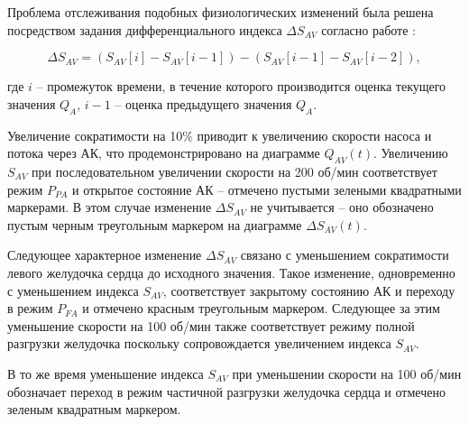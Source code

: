 Проблема отслеживания подобных физиологических изменений была решена посредством задания дифференциального индекса $\Delta S_{AV}$ согласно работе \cite{Karantonis_2006}:

\begin{equation}
	\Delta S_{AV} =  \left( S_{AV}[i] - S_{AV}[i-1] \right) - \left( S_{AV}[i-1] - S_{AV}[i-2] \right),
	\label{eq:delta_index}
\end{equation}

\noindent где $i$ -- промежуток времени, в течение которого производится оценка текущего значения $Q_A$, $i-1$ -- оценка предыдущего значения $Q_A$. 

Увеличение сократимости на 10\% приводит к увеличению скорости насоса и потока через АК, что продемонстрировано на диаграмме $Q_{AV}(t)$. Увеличению $S_{AV}$ при последовательном увеличении скорости на 200 об/мин соответствует режим $P_{PA}$ и открытое состояние АК -- отмечено пустыми зелеными квадратными маркерами. В этом случае изменение $\Delta S_{AV}$ не учитывается -- оно обозначено пустым черным треугольным маркером на диаграмме $\Delta S_{AV}(t)$. 

Следующее характерное изменение $\Delta S_{AV}$ связано с уменьшением сократимости левого желудочка сердца до исходного значения. Такое изменение, одновременно с уменьшением индекса $S_{AV}$, соответствует закрытому состоянию АК и переходу в режим $P_{FA}$ и отмечено красным треугольным маркером. Следующее за этим уменьшение скорости на 100 об/мин также соответствует режиму полной разгрузки желудочка поскольку сопровождается увеличением индекса $S_{AV}$. 

В то же время уменьшение индекса $S_{AV}$ при уменьшении скорости на 100 об/мин обозначает переход в режим частичной разгрузки желудочка сердца и отмечено зеленым квадратным маркером.  


